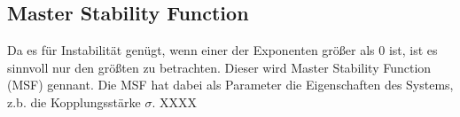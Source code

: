 \subsection*{Master Stability Function}
Da es für Instabilität genügt, wenn einer der Exponenten größer als 0 ist, ist es sinnvoll nur den größten zu betrachten. Dieser wird Master Stability Function (MSF) gennant. Die MSF hat dabei als Parameter die Eigenschaften des Systems, z.b. die Kopplungsstärke $\sigma$.
XXXX



